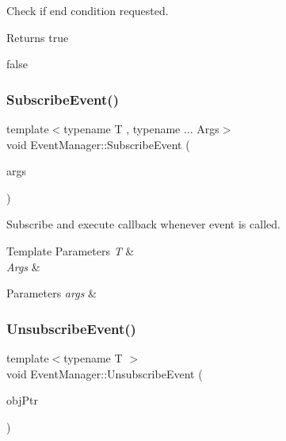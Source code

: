 Check if end condition requested. 

\begin{DoxyReturn}{Returns}
true 

false 
\end{DoxyReturn}
\mbox{\label{classEventManager_a7db87bd554657a6259b31bfd6d099047}} 
\subsubsection{\texorpdfstring{Subscribe\+Event()}{SubscribeEvent()}}
{\footnotesize\ttfamily template$<$typename T , typename ... Args$>$ \\
void Event\+Manager\+::\+Subscribe\+Event (\begin{DoxyParamCaption}\item[{Args...}]{args }\end{DoxyParamCaption})}



Subscribe and execute callback whenever event is called. 


\begin{DoxyTemplParams}{Template Parameters}
{\em T} & \\
\hline
{\em Args} & \\
\hline
\end{DoxyTemplParams}

\begin{DoxyParams}{Parameters}
{\em args} & \\
\hline
\end{DoxyParams}
\mbox{\label{classEventManager_afd78cf90f852fe86e147954fc73c02ac}} 
\subsubsection{\texorpdfstring{Unsubscribe\+Event()}{UnsubscribeEvent()}}
{\footnotesize\ttfamily template$<$typename T $>$ \\
void Event\+Manager\+::\+Unsubscribe\+Event (\begin{DoxyParamCaption}\item[{void $\ast$}]{obj\+Ptr }\end{DoxyParamCaption})}



